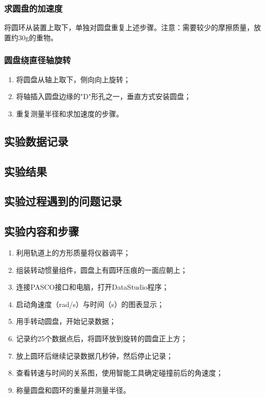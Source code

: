 \documentclass[dvipsnames, svgnames,a4paper,11pt]{article}
\newcommand{\recordblank}[1]{\par\vspace*{#1}\par}
\begin{document}
\subsubsection{求圆盘的加速度}
将圆环从装置上取下，单独对圆盘重复上述步骤。注意：需要较少的摩擦质量，放置约30g的重物。

\subsubsection{圆盘绕直径轴旋转}
\begin{enumerate}
	\item 将圆盘从轴上取下，侧向向上旋转；
	\item 将轴插入圆盘边缘的"D"形孔之一，垂直方式安装圆盘；
	\item 重复测量半径和求加速度的步骤。
\end{enumerate}

\subsection{实验数据记录}
\recordblank{9.2cm}
\subsection{实验结果}
\recordblank{5.0cm}
\subsection{实验过程遇到的问题记录}
\recordblank{5.0cm}

\subsection{实验内容和步骤}

\begin{enumerate}
	\item 利用轨道上的方形质量将仪器调平；
	\item 组装转动惯量组件，圆盘上有圆环压痕的一面应朝上；
	\item 连接PASCO接口和电脑，打开DataStudio程序；
	\item 启动角速度（rad/s）与时间（s）的图表显示；
	\item 用手转动圆盘，开始记录数据；
	\item 记录约25个数据点后，将圆环放到旋转的圆盘正上方；
	\item 放上圆环后继续记录数据几秒钟，然后停止记录；
	\item 查看转速与时间的关系图，使用智能工具确定碰撞前后的角速度；
	\item 称量圆盘和圆环的重量并测量半径。
\end{enumerate}
\end{document}
